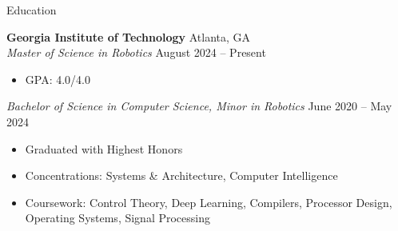 \documentclass{resume} %
\begin{document}

\vspace{-0.5em}
\begin{rSection}{Education}

{\bf Georgia Institute of Technology} \hfill Atlanta, GA\\
\textit{Master of Science in Robotics} \hfill August 2024 -- Present
\vspace{-0.5em}
\begin{itemize}
   \itemsep -5pt {}
   \item GPA: 4.0/4.0
\end{itemize}

\textit{Bachelor of Science in Computer Science, Minor in Robotics} \hfill June 2020 -- May 2024
\vspace{-0.5em}
\begin{itemize}
   \itemsep -5pt {}
   \item Graduated with Highest Honors
   \item Concentrations: Systems \& Architecture, Computer Intelligence
   \item Coursework: Control Theory, Deep Learning, Compilers, Processor Design, Operating Systems,
   Signal Processing
\end{itemize}

\end{rSection}

\end{document}
